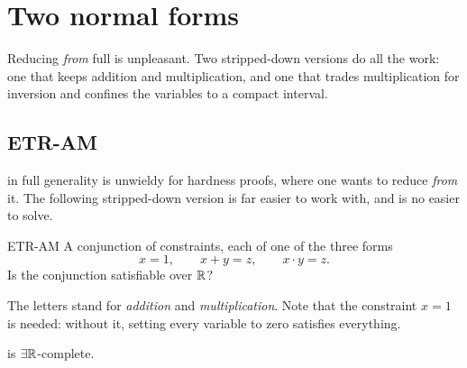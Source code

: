 \section{Two normal forms}
\label{sec:etr-normal-forms}

Reducing \emph{from} full \ETR{} is unpleasant. Two stripped-down versions do
all the work: one that keeps addition and multiplication, and one that trades
multiplication for inversion and confines the variables to a compact interval.

\subsection{ETR-AM}
\label{sec:etr-am}

\ETR{} in full generality is unwieldy for hardness proofs, where one wants to
reduce \emph{from} it. The following stripped-down version is far easier to work
with, and is no easier to solve.

\begin{probdef}{ETR-AM}
  \instance A conjunction of constraints, each of one of the three forms
  \[ x = 1, \qquad x + y = z, \qquad x \cdot y = z. \]
  \question Is the conjunction satisfiable over $\mathbb{R}$?
\end{probdef}

The letters stand for \emph{addition} and \emph{multiplication}. Note that the
constraint $x = 1$ is needed: without it, setting every variable to zero
satisfies everything.

\begin{lemma}\label{lem:etr-am}
 is $\exists\mathbb{R}$-complete.
\end{lemma}

